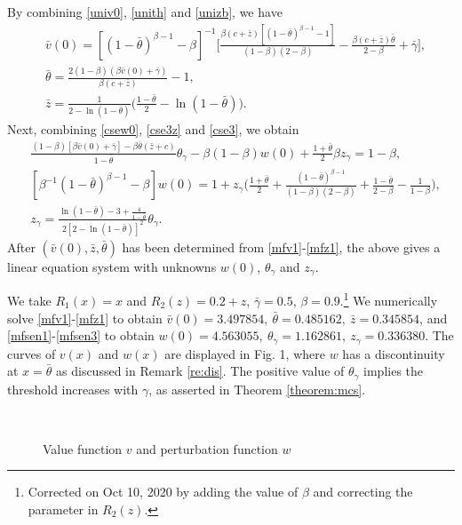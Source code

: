 \documentclass[graybox]{svmult}
\begin{document}
By combining  \eqref{univ0}, \eqref{unith} and \eqref{unizb},  we have
\begin{align}
&\bar v(0)=[(1-\bar \theta)^{\beta-1}-\beta ]^{-1}\Big[\frac{ \beta (c+\bar z)
[(1-\bar \theta)^{\beta-1}-1]}{(1-\beta)(2-\beta)} -\frac{\beta  (c+\bar z)\bar\theta}{2-\beta}
+\bar \gamma\Big], \label{mfv1}  \\
&\bar \theta= \frac{2(1-\beta)(\beta  \bar v(0) +\bar \gamma) }{\beta (c+\bar z)}-1, \label{mfs1} \\
&\bar z=\frac{1}{2-\ln(1-\bar\theta)} \big(\frac{1-\bar \theta}{2}-\ln (1-\bar \theta)\big). \label{mfz1}
\end{align}
Next, combining \eqref{csew0}, \eqref{cse3z} and \eqref{cse3},  we obtain
\begin{align}
& \frac{(1-\beta)[\beta \bar v(0)+\bar\gamma]-\beta \bar \theta (\bar z+c) }{1-\bar \theta}\theta_\gamma
- \beta (1-\beta )
w(0)+   \frac{1+\bar\theta}{2}\beta z_\gamma = 1-\beta , \label{mfsen1} \\
&[\beta^{-1}(1-\bar \theta)^{\beta-1}-\beta]w(0)= 1+z_\gamma \Big(\frac{1+\bar\theta}{2} +\frac{(1-\bar\theta)^{\beta-1}}{ (1-\beta)(2-\beta)} +\frac{1-\bar\theta}{2-\beta} - \frac{1}{1-\beta}  \Big), \label{mfsen2}\\
&z_\gamma = \frac{\ln (1-\bar \theta)-3 +\frac{4}{1-\bar \theta}}{2[2-\ln (1-\bar \theta)]^2} \theta_\gamma. \label{mfsen3}
\end{align}
 After $(\bar v(0),\bar z, \bar \theta )$ has been determined from \eqref{mfv1}-\eqref{mfz1}, the above gives a linear  equation system with unknowns $w(0)$, $\theta_\gamma$ and $ z_\gamma$.
\begin{example}
We take $R_1(x)=x$ and $R_2(z)= 0.2+z$, $\bar \gamma=0.5$, $\beta=0.9$.\footnote{Corrected on Oct 10, 2020 by adding the value of $\beta$ and correcting the parameter in $R_2(z)$.}
We numerically solve \eqref{mfv1}-\eqref{mfz1} to obtain $\bar v(0)= 3.497854,\  \bar \theta =0.485162,\  \bar z =  0.345854$, and \eqref{mfsen1}-\eqref{mfsen3}
 to obtain  $ w(0)= 4.563055,\  \theta_\gamma= 1.162861,\
 z_\gamma=  0.336380$. The curves of $v(x)$ and $w(x)$ are displayed in Fig. 1, where $w$ has a discontinuity at $x=\bar \theta$ as discussed in Remark \ref{re:dis}. The positive value of $\theta_\gamma$ implies the threshold increases with $\gamma$, as asserted in Theorem \ref{theorem:mcs}.
\end{example}
\begin{figure}[t]
\begin{center}
\\
\end{center}
\caption{ Value function $v$ and perturbation function $w$ } \label{fig1}
\end{figure}
\end{document}
